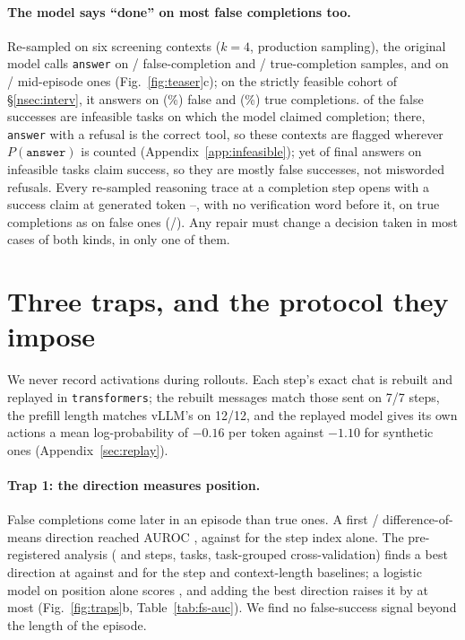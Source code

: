 \paragraph{The model says ``done'' on most false completions too.} Re-sampled on six screening contexts ($k=4$, production sampling), the original model calls \texttt{answer} on \bPilotFsAnswer/\bPilotFsN{} false-completion and \bPilotTrueAnswer/\bPilotTrueN{} true-completion samples, and on \bPilotHealthyAnswer/\bPilotHealthyN{} mid-episode ones (Fig.~\ref{fig:teaser}c); on the strictly feasible cohort of \S\ref{nsec:interv}, it answers on \pwOrigFsp{} (\pwOrigFspPct\%) false and \pwOrigFsm{} (\pwOrigFsmPct\%) true completions. \oswFsInfeasible{} of the false successes are infeasible tasks on which the model claimed completion; there, \texttt{answer} with a refusal is the correct tool, so these contexts are flagged wherever $P(\texttt{answer})$ is counted (Appendix~\ref{app:infeasible}); yet \infClaim{} of \infAnswered{} final answers on infeasible tasks claim success, so they are mostly false successes, not misworded refusals. Every re-sampled reasoning trace at a completion step opens with a success claim at generated token \thTokMin--\thTokMax, with no verification word before it, on true completions as on false ones (\thNVerif/\thN). Any repair must change a decision taken in most cases of both kinds, in only one of them.

\section{Three traps, and the protocol they impose}
\label{nsec:traps}
We never record activations during rollouts. Each step's exact chat is rebuilt and replayed in \texttt{transformers}; the rebuilt messages match those sent on 7/7 steps, the prefill length matches vLLM's on 12/12, and the replayed model gives its own actions a mean log-probability of $-0.16$ per token against $-1.10$ for synthetic ones (Appendix~\ref{sec:replay}). %

\paragraph{Trap 1: the direction measures position.} False completions come later in an episode than true ones. A first \fsp/\fsm{} difference-of-means direction reached AUROC \prvAucPost, against \prvBaseStep{} for the step index alone. The pre-registered analysis (\ofPos{} \fsp{} and \ofNeg{} \fsm{} steps, \ofTasks{} tasks, task-grouped cross-validation) finds a best direction at \ofResidAuc{} against \ofBaseStep{} and \ofBaseCtx{} for the step and context-length baselines; a logistic model on position alone scores \ofPosOnly, and adding the best direction raises it by at most \ofPosGain{} (Fig.~\ref{fig:traps}b, Table~\ref{tab:fs-auc}). We find no false-success signal beyond the length of the episode.


